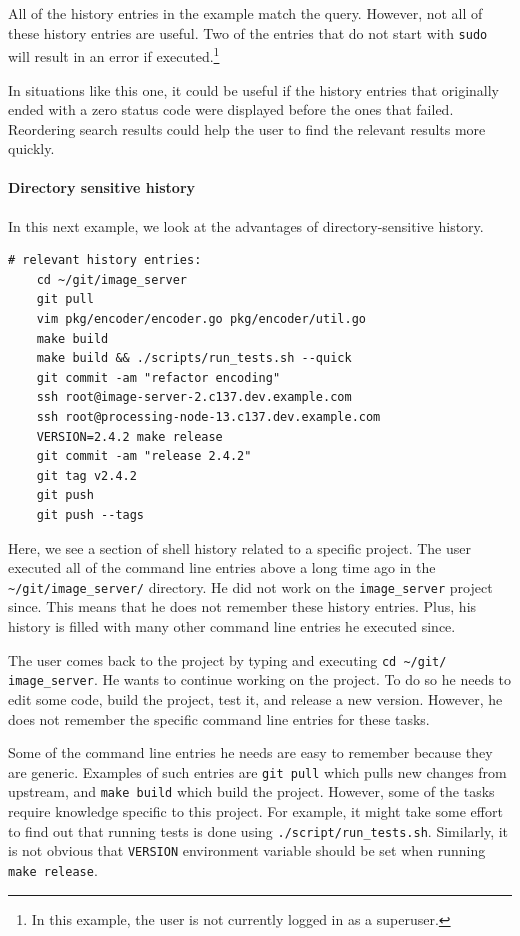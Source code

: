 All of the history entries in the example match the query. However, not all of these history entries are useful. Two of the entries that do not start with \verb|sudo| will result in an error if executed.\footnote{In this example, the user is not currently logged in as a superuser.} 

In situations like this one, it could be useful if the history entries that originally ended with a zero status code were displayed before the ones that failed. Reordering search results could help the user to find the relevant results more quickly. 

\paragraph{Directory sensitive history}

In this next example, we look at the advantages of directory-sensitive history.

\begin{verbatim}
# relevant history entries:
    cd ~/git/image_server
    git pull
    vim pkg/encoder/encoder.go pkg/encoder/util.go
    make build
    make build && ./scripts/run_tests.sh --quick
    git commit -am "refactor encoding"
    ssh root@image-server-2.c137.dev.example.com
    ssh root@processing-node-13.c137.dev.example.com
    VERSION=2.4.2 make release
    git commit -am "release 2.4.2"
    git tag v2.4.2
    git push
    git push --tags
\end{verbatim}

Here, we see a section of shell history related to a specific project. The user executed all of the command line entries above a long time ago in the \verb|~/git/image_server/| directory. He did not work on the \verb|image_server| project since. This means that he does not remember these history entries. Plus, his history is filled with many other command line entries he executed since.

The user comes back to the project by typing and executing \verb|cd ~/git/| \verb|image_server|. He wants to continue working on the project. To do so he needs to edit some code, build the project, test it, and release a new version. However, he does not remember the specific command line entries for these tasks. 

Some of the command line entries he needs are easy to remember because they are generic. Examples of such entries are \verb|git pull| which pulls new changes from upstream, and \verb|make build| which build the project. However, some of the tasks require knowledge specific to this project. For example, it might take some effort to find out that running tests is done using \verb|./script/run_tests.sh|. Similarly, it is not obvious that \verb|VERSION| environment variable should be set when running \verb|make release|.

